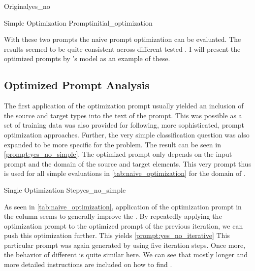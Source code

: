 \begin{prompt}{\KISS Original}{yes_no}
    \\
    
\end{prompt}

\begin{prompt}{Simple Optimization Prompt}{initial_optimization}
    \\
    
\end{prompt}

With these two prompts the naive prompt optimization can be evaluated.
The results seemed to be quite consistent across different tested \LLMs.
I will present the optimized prompts by \OAI's \gpt model as an example of these.

\subsection{Optimized Prompt Analysis}
\label{subsec:Evaluation:naive_optimization:optimized-prompt-analysis}
The first application of the optimization prompt usually yielded an inclusion of the source and target types into the text of the prompt.
This was possible as a set of training data was also provided for following, more sophisticated, prompt optimization approaches.
Further, the very simple classification question  was also expanded to be more specific for the \TLR problem.
The result can be seen in \autoref{prompt:yes_no_simple}.
The optimized prompt only depends on the input prompt and the domain of the source and target elements.
This very prompt thus is used for all simple \gpt evaluations in \autoref{tab:naive_optimization} for the domain of \RtR.

\begin{prompt}{\KISS Single Optimization Step}{yes_no_simple}
    \\
    
\end{prompt}

As seen in \autoref{tab:naive_optimization}, application of the optimization prompt in the column  seems to generally improve the \fone.
By repeatedly applying the optimization prompt to the optimized prompt of the previous iteration, we can push this optimization further.
This yields \autoref{prompt:yes_no_iterative}
This particular prompt was again generated by \gpt using five iteration steps.
Once more, the behavior of different \LLMs is quite similar here.
We can see that mostly longer and more detailed instructions are included on how to find \TLs.

